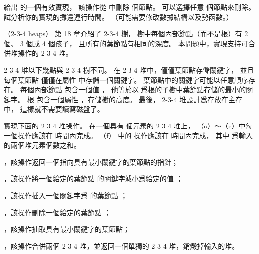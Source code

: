 \startANSWER
{}
\stopANSWER

\startigBase[continue]\startitem
給出  的一個有效實現，
該操作從  中刪除  個節點。
可以選擇任意  個節點來刪除。
試分析你的實現的攤還運行時間。
（\hint 可能需要修改數據結構以及勢函數。）
\stopitem\stopigBase

\startANSWER
{}
\stopANSWER

\stopPROBLEM

\startPROBLEM
（2-3-4 heaps）
第 18 章介紹了 2-3-4 樹，
樹中每個內部節點（而不是根）有 2 個、 3 個或 4 個孩子，
且所有的葉節點有相同的深度。
本問題中，實現支持可合併堆操作的 2-3-4 堆。

2-3-4 堆以下幾點與 2-3-4 樹不同。
在 2-3-4 堆中，僅僅葉節點存儲關鍵字，
並且每個葉節點  僅僅在屬性  中存儲一個關鍵字。
葉節點中的關鍵字可能以任意順序存在。
每個內部節點  包含一個值 ，
他等於以  爲根的子樹中葉節點存儲的最小的關鍵字。
根  包含一個屬性 ，存儲樹的高度。
最後， 2-3-4 堆設計爲存放在主存中，
這樣就不需要讀寫磁盤了。

實現下面的 2-3-4 堆操作。
在一個具有  個元素的 2-3-4 堆上，
（a）～（e）中每一個操作應該在  時間內完成。
（f） 中的  操作應該在  時間內完成，
其中  爲輸入的兩個堆元素個數之和。

\startigBase[a]
\item {}，該操作返回一個指向具有最小關鍵字的葉節點的指針；
\item {}，該操作將一個給定的葉節點  的關鍵字減小爲給定的值 ；
\item {}，該操作插入一個關鍵字爲  的葉節點 ；
\item {}，該操作刪除一個給定的葉節點 ；
\item {}，該操作抽取具有最小關鍵字的葉節點；
\item {}，該操作合併兩個 2-3-4 堆，並返回一個單獨的 2-3-4 堆，銷燬掉輸入的堆。
\stopigBase

\startANSWER
{}
\stopANSWER

\stopPROBLEM

\stopsubject%
